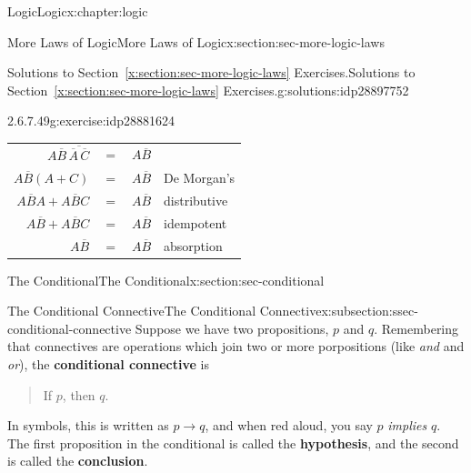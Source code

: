 \documentclass[twoside,10pt,]{book}
\newcommand{\tabularfont}{\relax}
\newcommand{\xreffont}{\relax}
\newcommand{\terminology}[1]{\textbf{#1}}
\numberwithin{equation}{section}
\newcommand{\conditional}{{p {\rightarrow} q}}
\begin{document}
\begin{chapterptx}{Logic}{}{Logic}{}{}{x:chapter:logic}
\begin{sectionptx}{More Laws of Logic}{}{More Laws of Logic}{}{}{x:section:sec-more-logic-laws}
\begin{solutions-subsection}{Solutions to Section~{\xreffont\ref*{x:section:sec-more-logic-laws}} Exercises.}{}{Solutions to Section~{\xreffont\ref*{x:section:sec-more-logic-laws}} Exercises.}{}{}{g:solutions:idp28897752}
\begin{exercisegroup}
\begin{divisionsolutioneg}{2.6.7.49}{}{g:exercise:idp28881624}%
\par\smallskip%
\noindent\hypertarget{g:solution:idp28882392-main}{}\begin{center}%
{\tabularfont%
\begin{tabular}{llll}
\multicolumn{1}{r}{\(A\overline{B}{}\,\overline{\overline{A}{}\,\overline{C}{}}\)}&\(=\)&\(A\overline{B}{}\)&\tabularnewline[0pt]
\multicolumn{1}{r}{\(A\overline{B}{}(A+C)\)}&\(=\)&\(A\overline{B}{}\)&De Morgan's\tabularnewline[0pt]
\multicolumn{1}{r}{\(A\overline{B}{}A+A\overline{B}{}C\)}&\(=\)&\(A\overline{B}{}\)&distributive\tabularnewline[0pt]
\multicolumn{1}{r}{\(A\overline{B}{}+A\overline{B}{}C\)}&\(=\)&\(A\overline{B}{}\)&idempotent\tabularnewline[0pt]
\multicolumn{1}{r}{\(A\overline{B}{}\)}&\(=\)&\(A\overline{B}{}\)&absorption
\end{tabular}
}%
\end{center}%
\end{divisionsolutioneg}%
\end{exercisegroup}
\par\medskip\noindent
\end{solutions-subsection}
\end{sectionptx}
%
%
\typeout{************************************************}
\typeout{************************************************}
%
\begin{sectionptx}{The Conditional}{}{The Conditional}{}{}{x:section:sec-conditional}
%
%
\typeout{************************************************}
\typeout{************************************************}
%
\begin{subsectionptx}{The Conditional Connective}{}{The Conditional Connective}{}{}{x:subsection:ssec-conditional-connective}
Suppose we have two propositions, \(p\) and \(q\).  Remembering that connectives are operations which join two or more porpositions (like \emph{and} and \emph{or}), the \terminology{conditional connective} is \begin{quote}%
If \(p\), then \(q\).\end{quote}
%
\par
In symbols, this is written as \(\conditional\), and when red aloud, you say \(p\) \emph{implies} \(q\).  The first proposition in the conditional is called the \terminology{hypothesis}, and the second is called the \terminology{conclusion}.%

\end{subsectionptx}
\end{sectionptx}
\end{chapterptx}
\end{document}
